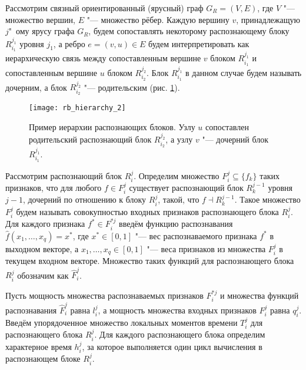 Рассмотрим связный ориентированный (ярусный) граф $G_R=(V,E)$, где $V$ "--- множество вершин, $E$ "--- множество рёбер. Каждую вершину $v$, принадлежащую $j$"~ому ярусу графа $G_R$, будем сопоставлять некоторому распознающему блоку $R_{i_1}^{j_1}$ уровня $j_1$, а ребро $e=(v,u){\in}E$ будем интерпретировать как иерархическую связь между сопоставленным вершине $v$ блоком $R_{i_1}^{j_1 }$ и сопоставленным вершине $u$ блоком $R_{i_2}^{j_2}$. Блок $R_{i_1}^{j_1 }$ в данном случае будем называть дочерним, а блок $R_{i_2}^{j_2}$ "--- родительским (рис. \ref{fg:rb_hier}).

\begin{figure}[h]
	\centering
	\texttt{[image: rb\_hierarchy\_2]}
	\caption{Пример иерархии распознающих блоков. Узлу $u$ сопоставлен родительский распознающий блок $R_{i_2}^{j_2}$, а узлу $v$ "--- дочерний блок $R_{i_1}^{j_1}$.}
	\label{fg:rb_hier}
\end{figure}

Рассмотрим распознающий блок $R_i^j$. Определим множество $F_i^j{\subseteq}\{f_k\}$ таких признаков, что для любого $f{\in}F_i^j$ существует распознающий блок $R_k^{j-1}$ уровня $j-1$, дочерний по отношению к блоку $R_i^j$, такой, что $f{\dashv}R_k^{j-1}$. Такое множество $F_i^j$ будем называть совокупностью входных признаков распознающего блока $R_i^j$. Для каждого признака $f^*{\in}F_i^{*j}$ введём функцию распознавания $\hat{f}(x_1,\dots,x_q )=x^*$, где $x^*{\in}[0,1]$ "--- вес распознаваемого признака $f^*$ в выходном векторе, а $x_1,\dots,x_q{\in}[0,1]$ "--- веса признаков из множества $F_i^j$ в текущем входном векторе. Множество таких функций для распознающего блока $R_i^j$ обозначим как $\hat{F}_i^j$.

Пусть мощность множества распознаваемых признаков $F_i^{*j}$ и множества функций распознавания $\hat{F}_i^j$ равна $l_i^j$, а мощность множества входных признаков $F_i^j$ равна $q_i^j$. Введём упорядоченное множество локальных моментов времени $T_i^j$ для распознающего блока $R_i^j$. Для каждого распознающего блока определим характерное время $h_i^j$, за которое выполняется один цикл вычисления в распознающем блоке $R_i^j$. 

